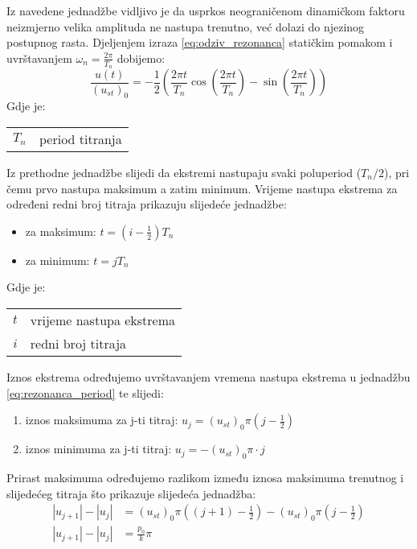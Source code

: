 Iz navedene jednadžbe vidljivo je da usprkos neograničenom dinamičkom faktoru
neizmjerno velika amplituda ne nastupa trenutno, već dolazi do njezinog 
postupnog rasta. Djeljenjem izraza \eqref{eq:odziv_rezonanca} statičkim pomakom i
uvrštavanjem $\omega_n=\frac{2\pi}{T_n}$ dobijemo:
\begin{equation}\label{eq:rezonanca_period}
    \frac{u(t)}{(u_{st})_0}=-\frac{1}{2}
        \left(\frac{2\pi t}{T_n}
                \cos\left(\frac{2\pi t}{T_n}\right)
                -
                \sin\left(\frac{2\pi t}{T_n}\right)
        \right)
\end{equation}
Gdje je:
\begin{table}[H]
    \begin{tabular} {r l}
        $T_n$ & period titranja\\
    \end{tabular}
\end{table}

Iz prethodne jednadžbe slijedi da ekstremi nastupaju svaki poluperiod ($T_n/2$), pri
čemu prvo nastupa maksimum a zatim minimum. Vrijeme nastupa ekstrema za određeni
redni broj titraja prikazuju slijedeće jednadžbe:
\begin{itemize}
    \item za maksimum: $t=(i-\frac{1}{2})T_n$
    \item za minimum: $t=jT_n$
\end{itemize}
Gdje je:
\begin{table}[H]
    \begin{tabular} {r l}
        $t$ & vrijeme nastupa ekstrema\\
        $i$ & redni broj titraja\\
    \end{tabular}
\end{table}
Iznos ekstrema određujemo uvrštavanjem vremena nastupa ekstrema u jednadžbu
\eqref{eq:rezonanca_period} te slijedi:
\begin{enumerate}
    \item iznos maksimuma za j-ti titraj: $u_j=(u_{st})_0\pi(j-\frac{1}{2})$
    \item iznos minimuma za j-ti titraj: $u_j=-(u_{st})_0\pi\cdot j$ 
\end{enumerate}

Prirast maksimuma određujemo razlikom između iznosa maksimuma trenutnog i slijedećeg
titraja što prikazuje slijedeća jednadžba:
\begin{equation}\label{eq:prirast_maksimuma}
    \begin{split}
        |u_{j+1}|-|u_j| &=(u_{st})_0\pi((j+1)-\frac{1}{2})-(u_{st})_0\pi(j-\frac{1}{2})\\
        |u_{j+1}|-|u_j| &= \frac{p_0}{k}\pi
    \end{split}
\end{equation}


